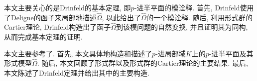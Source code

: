 本文主要关心的是Drinfeld的基本定理, 即$p$-进半平面的模诠释.
首先, Drinfeld使用了Deligne的函子来局部地描述$\hat{\Omega}$, 以此给出了$\hat{\Omega}$的一个模诠释. 随后, 利用形式群的Cartier理论, Drinfeld构造出了函子$\hat{\Omega}$到该模问题的自然变换, 并且证明其为同构, 从而完成基本定理的证明.

本文主要参考了\cite{BC91}. 
首先, 本文具体地构造和描述了$p$-进局部域$K$上的$p$-进半平面及其形式模型$\hat{\Omega}$. 随后, 本文回顾了形式群以及形式群的Cartier理论的主要结果. 最后, 本文陈述了Drinfeld定理并给出其中的主要构造.



